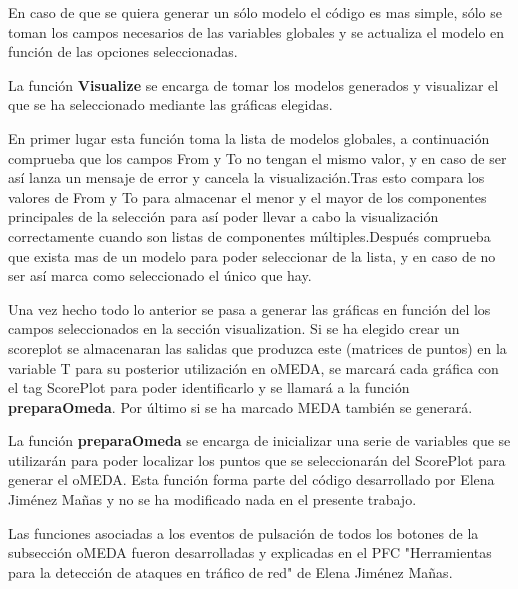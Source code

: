 \bigskip

En caso de que se quiera generar un sólo modelo el código es mas simple, sólo se toman los campos necesarios de las variables globales y se actualiza el modelo en función de las opciones seleccionadas.
\bigskip

La función \textbf{Visualize} se encarga de tomar los modelos generados y visualizar el que se ha seleccionado mediante las gráficas elegidas.

\bigskip

En primer lugar esta función toma la lista de modelos globales, a continuación comprueba que los campos From y To no tengan el mismo valor, y en caso de ser así lanza un mensaje de error y cancela la visualización.Tras esto compara los valores de From y To para almacenar el menor y el mayor de los componentes principales de la selección para así poder llevar a cabo la visualización correctamente cuando son listas de componentes múltiples.Después comprueba que exista mas de un modelo para poder seleccionar de la lista, y en caso de no ser así marca como seleccionado el único que hay.

\bigskip

Una vez hecho todo lo anterior se pasa a generar las gráficas en función del los campos seleccionados en la sección visualization. Si se ha elegido crear un scoreplot se almacenaran las salidas que produzca este (matrices de puntos) en la variable T para su posterior utilización en oMEDA, se marcará cada gráfica con el tag ScorePlot para poder identificarlo y se llamará a la función \textbf{preparaOmeda}. Por último si se ha marcado MEDA también se generará.
\bigskip

La función \textbf{preparaOmeda} se encarga de inicializar una serie de variables que se utilizarán para poder localizar los puntos que se seleccionarán del ScorePlot para generar el oMEDA. Esta función forma parte del código desarrollado por Elena Jiménez Mañas y no se ha modificado nada en el presente trabajo.

\bigskip

Las funciones asociadas a los eventos de pulsación de todos los botones de la subsección oMEDA fueron desarrolladas y explicadas en el PFC "Herramientas para la detección de ataques en tráfico de red" de Elena Jiménez Mañas.